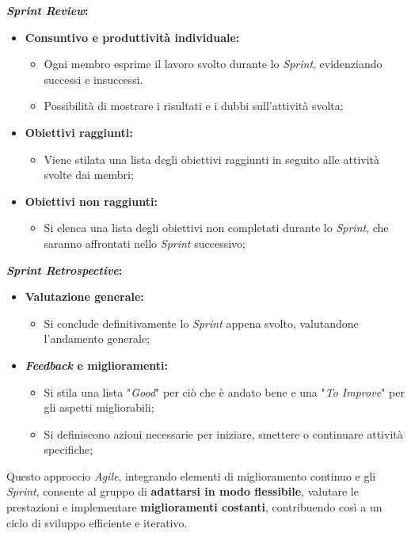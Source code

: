 \documentclass[5pt]{article}
\begin{document}
\textbf{\textit{Sprint Review}:}
\begin{itemize}
    \item \textbf{Consuntivo e produttività individuale:}
    \begin{itemize}
        \item Ogni membro esprime il lavoro svolto durante lo \textit{Sprint}, evidenziando successi e insuccessi.
        \item Possibilità di mostrare i risultati e i dubbi sull'attività svolta;
    \end{itemize}
    \item \textbf{Obiettivi raggiunti:}
    \begin{itemize}
        \item Viene stilata una lista degli obiettivi raggiunti in seguito alle attività svolte dai membri;
    \end{itemize}
    \item \textbf{Obiettivi non raggiunti:}
    \begin{itemize}
        \item Si elenca una lista degli obiettivi non completati durante lo \textit{Sprint}, che saranno affrontati nello \textit{Sprint} successivo;
    \end{itemize}
\end{itemize}

\textbf{\textit{Sprint Retrospective}:}
\begin{itemize}
    \item \textbf{Valutazione generale:}
    \begin{itemize}
        \item Si conclude definitivamente lo \textit{Sprint} appena svolto, valutandone l'andamento generale;
    \end{itemize}
    \item \textbf{\textit{Feedback} e miglioramenti:}
    \begin{itemize}
        \item Si stila una lista "\textit{Good}" per ciò che è andato bene e una "\textit{To Improve}" per gli aspetti migliorabili;
        \item Si definiscono azioni necessarie per iniziare, smettere o continuare attività specifiche;
    \end{itemize}
\end{itemize}

Questo approccio \textit{Agile}, integrando elementi di miglioramento continuo e gli \textit{Sprint}, consente al gruppo di \textbf{adattarsi in modo flessibile}, valutare le prestazioni e implementare \textbf{miglioramenti costanti}, contribuendo così a un ciclo di sviluppo efficiente e iterativo.
\end{document}
